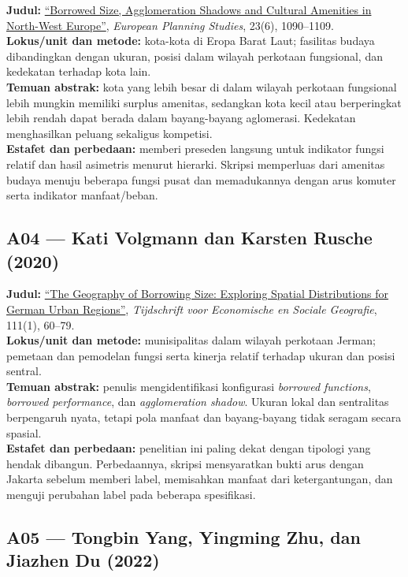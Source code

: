 \documentclass[
  indonesian,
  11pt,
  a4paper,
  oneside,
  openany]{report}
\begin{document}
\textbf{Judul:}
\href{https://doi.org/10.1080/09654313.2014.905002}{``Borrowed Size,
Agglomeration Shadows and Cultural Amenities in North-West Europe''},
\emph{European Planning Studies}, 23(6), 1090--1109.\\
\textbf{Lokus/unit dan metode:} kota-kota di Eropa Barat Laut; fasilitas
budaya dibandingkan dengan ukuran, posisi dalam wilayah perkotaan
fungsional, dan kedekatan terhadap kota lain.\\
\textbf{Temuan abstrak:} kota yang lebih besar di dalam wilayah
perkotaan fungsional lebih mungkin memiliki surplus amenitas, sedangkan
kota kecil atau berperingkat lebih rendah dapat berada dalam
bayang-bayang aglomerasi. Kedekatan menghasilkan peluang sekaligus
kompetisi.\\
\textbf{Estafet dan perbedaan:} memberi preseden langsung untuk
indikator fungsi relatif dan hasil asimetris menurut hierarki. Skripsi
memperluas dari amenitas budaya menuju beberapa fungsi pusat dan
memadukannya dengan arus komuter serta indikator manfaat/beban.

\subsection{A04 --- Kati Volgmann dan Karsten Rusche
(2020)}\label{a04-kati-volgmann-dan-karsten-rusche-2020}

\textbf{Judul:} \href{https://doi.org/10.1111/tesg.12362}{``The
Geography of Borrowing Size: Exploring Spatial Distributions for German
Urban Regions''}, \emph{Tijdschrift voor Economische en Sociale
Geografie}, 111(1), 60--79.\\
\textbf{Lokus/unit dan metode:} munisipalitas dalam wilayah perkotaan
Jerman; pemetaan dan pemodelan fungsi serta kinerja relatif terhadap
ukuran dan posisi sentral.\\
\textbf{Temuan abstrak:} penulis mengidentifikasi konfigurasi
\emph{borrowed functions}, \emph{borrowed performance}, dan
\emph{agglomeration shadow}. Ukuran lokal dan sentralitas berpengaruh
nyata, tetapi pola manfaat dan bayang-bayang tidak seragam secara
spasial.\\
\textbf{Estafet dan perbedaan:} penelitian ini paling dekat dengan
tipologi yang hendak dibangun. Perbedaannya, skripsi mensyaratkan bukti
arus dengan Jakarta sebelum memberi label, memisahkan manfaat dari
ketergantungan, dan menguji perubahan label pada beberapa spesifikasi.

\subsection{A05 --- Tongbin Yang, Yingming Zhu, dan Jiazhen Du
(2022)}\label{a05-tongbin-yang-yingming-zhu-dan-jiazhen-du-2022}
\end{document}
